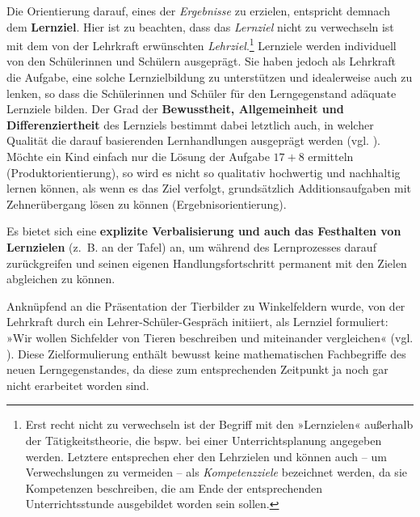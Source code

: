 \documentclass[
]{scrbook}
\renewenvironment{quote}{
  \list{}{
	\leftmargin0.2cm   %
    \rightmargin\leftmargin
      	\def\FrameCommand
    {%
        {\color{quoteColor}\vrule width 2pt}%
        \hspace{0pt}%
    }%
    \MakeFramed{\advance \hsize -\width \FrameRestore}    \color{quoteColor}
    }
  \item\relax
}
{\endlist\color{black}\endMakeFramed}
\theoremstyle{definition}
\theoremstyle{definition}
\theoremstyle{definition}
\theoremstyle{definition}
\theoremstyle{remark}
\begin{document}
Die Orientierung darauf, eines der \emph{Ergebnisse} zu erzielen, entspricht demnach dem \textbf{Lernziel}. Hier ist zu beachten, dass das \emph{Lernziel} nicht zu verwechseln ist mit dem von der Lehrkraft erwünschten \emph{Lehrziel}.\footnote{Erst recht nicht zu verwechseln ist der Begriff mit den »Lernzielen« außerhalb der Tätigkeitstheorie, die bspw. bei einer Unterrichtsplanung angegeben werden. Letztere entsprechen eher den Lehrzielen und können auch -- um Verwechslungen zu vermeiden -- als \emph{Kompetenzziele} bezeichnet werden, da sie Kompetenzen beschreiben, die am Ende der entsprechenden Unterrichtsstunde ausgebildet worden sein sollen.} Lernziele werden individuell von den Schülerinnen und Schülern ausgeprägt. Sie haben jedoch als Lehrkraft die Aufgabe, eine solche Lernzielbildung zu unterstützen und idealerweise auch zu lenken, so dass die Schülerinnen und Schüler für den Lerngegenstand adäquate Lernziele bilden. Der Grad der \textbf{Bewusstheit, Allgemeinheit und Differenziertheit} des Lernziels bestimmt dabei letztlich auch, in welcher Qualität die darauf basierenden Lernhandlungen ausgeprägt werden (vgl. ). Möchte ein Kind einfach nur die Lösung der Aufgabe \(17+8\) ermitteln (Produktorientierung), so wird es nicht so qualitativ hochwertig und nachhaltig lernen können, als wenn es das Ziel verfolgt, grundsätzlich Additionsaufgaben mit Zehnerübergang lösen zu können (Ergebnisorientierung).

Es bietet sich eine \textbf{explizite Verbalisierung und auch das Festhalten von Lernzielen} (z.~B. an der Tafel) an, um während des Lernprozesses darauf zurückgreifen und seinen eigenen Handlungsfortschritt permanent mit den Zielen abgleichen zu können.

\begin{quote}
Anknüpfend an die Präsentation der Tierbilder zu Winkelfeldern wurde, von der Lehrkraft durch ein Lehrer-Schüler-Gespräch initiiert, als Lernziel formuliert: »Wir wollen Sichfelder von Tieren beschreiben und miteinander vergleichen« (vgl. ). Diese Zielformulierung enthält bewusst keine mathematischen Fachbegriffe des neuen Lerngegenstandes, da diese zum entsprechenden Zeitpunkt ja noch gar nicht erarbeitet worden sind.
\end{quote}
\end{document}
